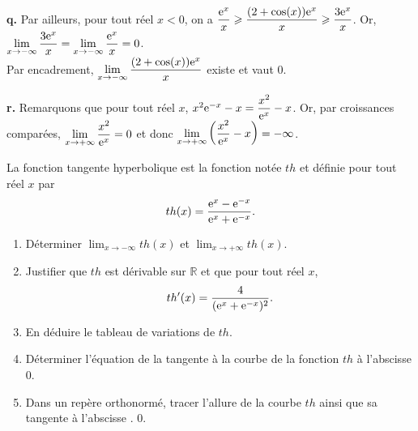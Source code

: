 \documentclass[11pt,fleqn, openany]{book} %
\begin{document}
\begin{solution}
\textbf{q.} Par ailleurs, pour tout réel $x<0$, on a $\dfrac{\mathrm{e}^x}{x} \geqslant \dfrac{(2+\cos(x))\mathrm{e}^x}{x}\geqslant \dfrac{3\mathrm{e}^x}{x}$. Or, $\displaystyle \lim_{x \to -\infty}\dfrac{3\mathrm{e}^x}{x}=\displaystyle \lim_{x \to -\infty}\dfrac{\mathrm{e}^x}{x}=0$. \\Par encadrement, $\displaystyle \lim_{x \to -\infty}\dfrac{(2+\cos(x))\mathrm{e}^x}{x}$ existe et vaut 0.

\textbf{r.}   Remarquons que pour tout réel $x$, $x^2\mathrm{e}^{-x}-x=\dfrac{x^2}{\mathrm{e}^x}-x$. Or, par croissances comparées, $\displaystyle \lim_{x\to+\infty} \dfrac{x^2}{\mathrm{e}^x}=0$ et donc $\displaystyle \lim_{x\to+\infty}\left(\dfrac{x^2}{\mathrm{e}^x}-x\right)=-\infty$.
\end{solution}






\begin{exercise}[topic=lim23]La fonction tangente hyperbolique est la fonction notée $th$ et définie pour tout réel $x$ par \[th(x)=\dfrac{\mathrm{e}^x-\mathrm{e}^{-x}}{\mathrm{e}^x+\mathrm{e}^{-x}}.\]
\begin{enumerate}
\item Déterminer $\displaystyle \lim_{x \to -\infty}th(x)$ et $\displaystyle \lim_{x \to +\infty} th(x)$.
\item Justifier que $th$ est dérivable sur $\mathbb{R}$ et que pour tout réel $x$,
\[th'(x)=\dfrac{4}{(\mathrm{e}^x+\mathrm{e}^{-x})^2}.\]
\item En déduire le tableau de variations de $th$.
\item Déterminer l'équation de la tangente à la courbe de la fonction $th$ à l'abscisse 0.
\item Dans un repère orthonormé, tracer l'allure de la courbe $th$ ainsi que sa tangente à l'abscisse .
0.\end{enumerate}\end{exercise}
\end{document}
